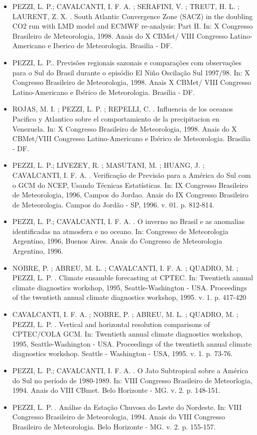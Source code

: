 \documentclass[11pt, a4paper]{awesome-cv}
\begin{document}
\begin{cvletter}
\begin{itemize}
  \item[] PEZZI, L. P.; CAVALCANTI, I. F. A. ; SERAFINI, V. ; TREUT, H. L. ; LAURENT, Z. X. . South Atlantic Convergence Zone (SACZ) in the doubling CO2 run with LMD model and ECMWF re-analysis: Part II. In: X Congresso Brasileiro de Meteorologia, 1998. Anais do X CBMet/ VIII Congresso Latino-Americano e Iberico de Meteorologia. Brasilia - DF.  
  \item[] PEZZI, L. P.. Previsões regionais sazonais e comparações com observações para o Sul do Brasil durante o episódio El Niño Oscilação Sul 1997/98. In: X Congresso Brasileiro de Meteorologia, 1998. Anais X CBMet/ VIII Congresso Latino-Americano e Ibérico de Meteorologia. Brasilia - DF. 
  \item[] ROJAS, M. I. ; PEZZI, L. P. ; REPELLI, C. . Influencia de los oceanos Pacifico y Atlantico sobre el comportamiento de la precipitacion en Venezuela. In: X Congresso Brasileiro de Meteorologia, 1998. Anais do X CBMet/VIII Congresso Latino-Americano e Ibérico de Meteorologia. Brasilia - DF. 
  \item[] PEZZI, L. P.; LIVEZEY, R. ; MASUTANI, M. ; HUANG, J. ; CAVALCANTI, I. F. A. . Verificação de Previsão para a América do Sul com o GCM do NCEP, Usando Técnicas Estatísticas. In: IX Congresso Brasileiro de Meteorologia, 1996, Campos do Jordao. Anais do IX Congresso Brasileiro de Meteorologia. Campos do Jordão - SP, 1996. v. 01. p. 812-814. 
  \item[] PEZZI, L. P.; CAVALCANTI, I. F. A. . O inverno no Brasil e as anomalias identificadas na atmosfera e no oceano. In: Congresso de Meteorologia Argentino, 1996, Buenos Aires. Anais do Congresso de Meteorologia Argentino, 1996. 
  \item[] NOBRE, P. ; ABREU, M. L. ; CAVALCANTI, I. F. A. ; QUADRO, M. ; PEZZI, L. P. . Climate ensamble forecasting at CPTEC. In: Twentieth annual climate diagnostics workshop, 1995, Seattle-Washington - USA. Proceedings of the twentieth annual climate diagnostics workshop, 1995. v. 1. p. 417-420
  \item[] CAVALCANTI, I. F. A. ; NOBRE, P. ; ABREU, M. L. ; QUADRO, M. ; PEZZI, L. P. . Vertical and horizontal resolution comparisons of CPTEC/COLA GCM. In: Twentieth annual climate diagnostics workshop, 1995, Seattle-Washington - USA. Proceedings of the twentieth annual climate diagnostics workshop. Seattle - Washington - USA, 1995. v. 1. p. 73-76. 
  \item[] PEZZI, L. P.; CAVALCANTI, I. F. A. . O Jato Subtropical sobre a América do Sul no período de 1980-1989. In: VIII Congresso Brasileiro de Meteorlogia, 1994. Anais do VIII CBmet. Belo Horizonte - MG. v. 2. p. 148-151. 
  \item[] PEZZI, L. P. . Análise da Estação Chuvosa do Leste do Nordeste. In: VIII Congresso Brasileiro de Meteorologia, 1994. Anais do VIII Congresso Brasileiro de Meteorologia. Belo Horizonte - MG. v. 2. p. 155-157. 
\end{itemize}


\end{cvletter}
\end{document}
